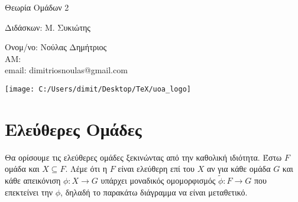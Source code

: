 \documentclass[oneside,a4paper]{article}
\newcommand {\tl}{\textlatin}
\begin{document}
	
	
	\begin{framed}	
		\begin{center}
			\huge Θεωρία Ομάδων 2
		\end{center}
		\begin{center}
			\huge Διδάσκων: Μ. Συκιώτης
		\end{center}
		\vspace{0.3truecm}
		\begin{center}
			Ονομ/νο: Νούλας Δημήτριος\\
			ΑΜ: \\
			\tl{email}: \tl{dimitriosnoulas@gmail.com}
		\end{center}
		\vspace{0.3truecm}
	\end{framed}
	\vspace*{\fill}
	\begin{center}
	\texttt{[image: C:/Users/dimit/Desktop/TeX/uoa\_logo]}
	\end{center}
\vspace{1cm}
\pagebreak

\section{Ελεύθερες Ομάδες}
\vspace{0.1cm}

Θα ορίσουμε τις ελεύθερες ομάδες ξεκινώντας από την καθολική ιδιότητα. Έστω $F$ ομάδα και $X\subseteq F$. Λέμε ότι η $F$ είναι ελεύθερη επί του $X$ αν για κάθε ομάδα $G$ και κάθε απεικόνιση $\phi : X \rightarrow G$ υπάρχει μοναδικός ομομορφισμός $\tilde{\phi} : F \rightarrow G$ που επεκτείνει την $\phi$, δηλαδή το παρακάτω διάγραμμα να είναι μεταθετικό.

\begin{figure}[ht]
	\centering
{}
\end{figure}
\end{document}
